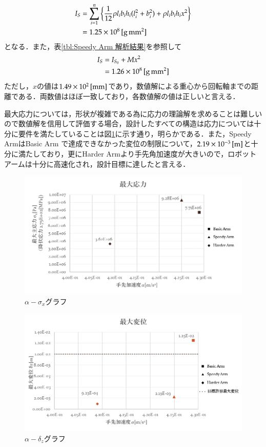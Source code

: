 \documentclass[10pt,b5paper,papersize,dvipdfmx]{jsbook}
\begin{document}
\begin{align}
  I_S &=\sum_{i=1}^{n} \left\{ \frac{1}{12} \rho l_ib_ih_i(l_i^2+b_i^2)+\rho l_ib_ih_ix^2 \right\} \notag\\
      &=1.25\times10^8\tani*{g\,mm^2}
\end{align}
となる．また，表\ref{tbl:Speedy Arm 解析結果}を参照して
\begin{align}
  I_S &= I_{S_0}+Mx^2 \notag \\
      &= 1.26\times10^8\tani*{g\,mm^2}
\end{align}
ただし，$x$の値は$1.49\times10^2 \tani*{mm}$であり，数値解による重心から回転軸までの距離である．両数値はほぼ一致しており，各数値解の値は正しいと言える．\par
最大応力については，形状が複雑である為に応力の理論解を求めることは難しいので数値解を信用して評価する場合，設計したすべての構造は応力については十分に要件を満たしていることは図\ref{fig:alpha-sigma_xグラフ}に示す通り，明らかである．また，Speedy ArmはBasic Arm で達成できなかった変位の制限について，$2.19\times10^{-3} \tani*{m}$と十分に満たしており，更にHarder Armより手先角加速度が大きいので，ロボットアームは十分に高速化され，設計目標に達したと言える．

\begin{figure}[htbp]
  \centering
  \includegraphics[width=13cm]{img/robot31.png}
  \caption{$\alpha-\sigma_x$グラフ}
  \label{fig:alpha-sigma_xグラフ}
\end{figure}
\begin{figure}[htbp]
  \centering
  \includegraphics[width=13cm]{img/robot32.png}
  \caption{$\alpha-\delta_z$グラフ}
  \label{fig:alpha-delta_zグラフ}
\end{figure}
\end{document}
